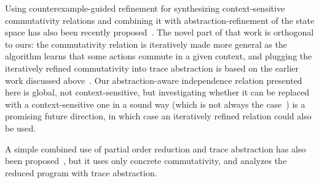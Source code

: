 \documentclass[numbook]{svjour3}
\begin{document}
Using counterexample-guided refinement for synthesizing context-sensitive commutativity relations and combining it with abstraction-refinement of the state space has also been recently proposed~\cite{cegcomm}. The novel part of that work is orthogonal to ours: the commutativity relation is iteratively made more general as the algorithm learns that some actions commute in a given context, and plugging the iteratively refined commutativity into trace abstraction is based on the earlier work discussed above~\cite{farzan_stratified_commutativity}. Our abstraction-aware independence relation presented here is global, not context-sensitive, but investigating whether it can be replaced with a context-sensitive one in a sound way (which is not always the case~\cite{farzan_sound_sequentialization}) is a promising future direction, in which case an iteratively refined relation could also be used.

A simple combined use of partial order reduction and trace abstraction has also been proposed~\cite{trace_abstr_por}, but it uses only concrete commutativity, and analyzes the reduced program with trace abstraction. 
 

\end{document}
